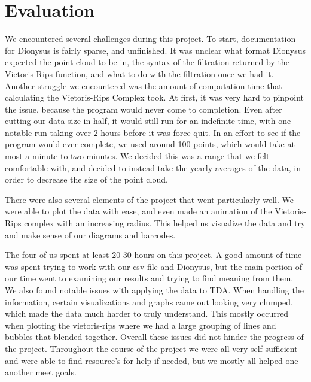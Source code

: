 \documentclass[12pt]{report}
\begin{document}
\section*{Evaluation}
We encountered several challenges during this project. To start, documentation for Dionysus is fairly sparse, and unfinished. It was unclear what format Dionysus expected the point cloud to be in, the syntax of the filtration returned by the Vietoris-Rips function, and what to do with the filtration once we had it. Another struggle we encountered was the amount of computation time that calculating the Vietoris-Rips Complex took. At first, it was very hard to pinpoint the issue, because the program would never come to completion. Even after cutting our data size in half, it would still run for an indefinite time, with one notable run taking over 2 hours before it was force-quit. In an effort to see if the program would ever complete, we used around 100 points, which would take at most a minute to two minutes. We decided this was a range that we felt comfortable with, and decided to instead take the yearly averages of the data, in order to decrease the size of the point cloud.\par 
There were also several elements of the project that went particularly well. We were able to plot the data with ease, and even made an animation of the Vietoris-Rips complex with an increasing radius. This helped us visualize the data and try and make sense of our diagrams and barcodes. \par
The four of us spent at least 20-30 hours on this project. A good amount of time was spent trying to work with our csv file and Dionysus, but the main portion of our time went to examining our results and trying to find meaning from them. We also found notable issues with applying the data to TDA. When handling the information, certain visualizations and graphs came out looking very clumped, which made the data much harder to truly understand. This mostly occurred when plotting the vietoris-rips where we had a large grouping of lines and bubbles that blended together. Overall these issues did not hinder the progress of the project. Throughout the course of the project we were all very self sufficient and were able to find resource's for help if needed, but we mostly all helped one another meet goals. \par

\clearpage
\end{document}
